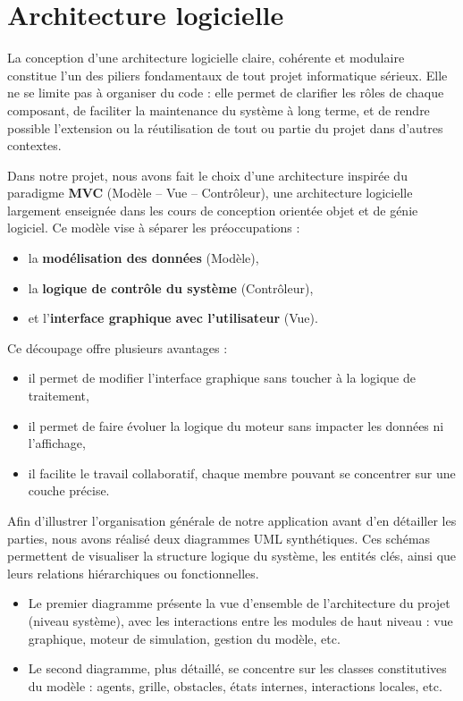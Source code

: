 

\section{Architecture logicielle}

La conception d'une architecture logicielle claire, cohérente et modulaire constitue l’un des piliers fondamentaux de tout projet informatique sérieux. Elle ne se limite pas à organiser du code : elle permet de clarifier les rôles de chaque composant, de faciliter la maintenance du système à long terme, et de rendre possible l’extension ou la réutilisation de tout ou partie du projet dans d'autres contextes.

Dans notre projet, nous avons fait le choix d’une architecture inspirée du paradigme \textbf{MVC} (Modèle – Vue – Contrôleur), une architecture logicielle largement enseignée dans les cours de conception orientée objet et de génie logiciel. Ce modèle vise à séparer les préoccupations :
\begin{itemize}
    \item la \textbf{modélisation des données} (Modèle),
    \item la \textbf{logique de contrôle du système} (Contrôleur),
    \item et l’\textbf{interface graphique avec l’utilisateur} (Vue).
\end{itemize}

Ce découpage offre plusieurs avantages :
\begin{itemize}
    \item il permet de modifier l’interface graphique sans toucher à la logique de traitement,
    \item il permet de faire évoluer la logique du moteur sans impacter les données ni l’affichage,
    \item il facilite le travail collaboratif, chaque membre pouvant se concentrer sur une couche précise.
\end{itemize}

Afin d’illustrer l’organisation générale de notre application avant d’en détailler les parties, nous avons réalisé deux diagrammes UML synthétiques. Ces schémas permettent de visualiser la structure logique du système, les entités clés, ainsi que leurs relations hiérarchiques ou fonctionnelles.

\begin{itemize}
    \item Le premier diagramme présente la vue d’ensemble de l’architecture du projet (niveau système), avec les interactions entre les modules de haut niveau : vue graphique, moteur de simulation, gestion du modèle, etc.
    \item Le second diagramme, plus détaillé, se concentre sur les classes constitutives du modèle : agents, grille, obstacles, états internes, interactions locales, etc.
\end{itemize}

